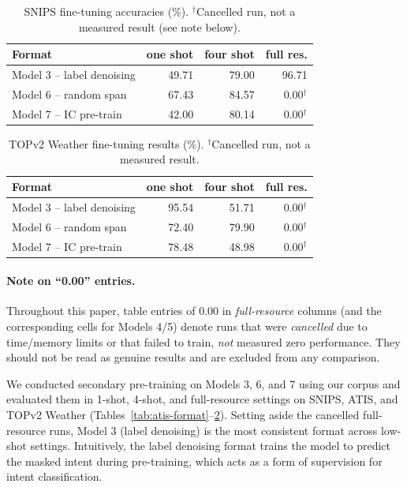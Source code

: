 \documentclass[11pt]{article}
\begin{document}
\begin{table}[t]
\centering
\small
\begin{tabular}{lrrr}
\toprule
Format & one shot & four shot & full res. \\
\midrule
Model 3 -- label denoising & 49.71 & 79.00 & 96.71 \\
Model 6 -- random span      & 67.43 & 84.57 & 0.00$^{\dagger}$ \\
Model 7 -- IC pre-train      & 42.00 & 80.14 & 0.00$^{\dagger}$ \\
\bottomrule
\end{tabular}
\caption{SNIPS fine-tuning accuracies (\%). $^{\dagger}$Cancelled run, not a
measured result (see note below).}
\label{tab:snips-format}
\end{table}

\begin{table}[t]
\centering
\small
\begin{tabular}{lrrr}
\toprule
Format & one shot & four shot & full res. \\
\midrule
Model 3 -- label denoising & 95.54 & 51.71 & 0.00$^{\dagger}$ \\
Model 6 -- random span      & 72.40 & 79.90 & 0.00$^{\dagger}$ \\
Model 7 -- IC pre-train      & 78.48 & 48.98 & 0.00$^{\dagger}$ \\
\bottomrule
\end{tabular}
\caption{TOPv2 Weather fine-tuning results (\%). $^{\dagger}$Cancelled
run, not a measured result.}
\label{tab:tops-format}
\end{table}

\paragraph{Note on ``0.00'' entries.} Throughout this paper, table entries
of $0.00$ in \emph{full-resource} columns (and the corresponding cells for
Models 4/5) denote runs that were \emph{cancelled} due to time/memory limits
or that failed to train, \emph{not} measured zero performance. They should
not be read as genuine results and are excluded from any comparison.

We conducted secondary pre-training on Models 3, 6, and 7 using our corpus
and evaluated them in 1-shot, 4-shot, and full-resource settings on SNIPS,
ATIS, and TOPv2 Weather (Tables~\ref{tab:atis-format}--\ref{tab:tops-format}).
Setting aside the cancelled full-resource runs, Model 3 (label denoising) is
the most consistent format across low-shot settings. Intuitively, the label
denoising format trains the model to predict the masked intent during
pre-training, which acts as a form of supervision for intent classification.
\end{document}
